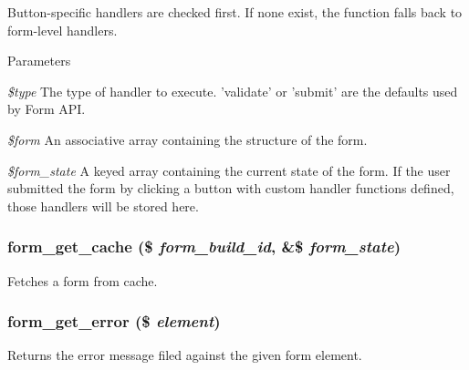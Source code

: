 Button-\/specific handlers are checked first. If none exist, the function falls back to form-\/level handlers.


\begin{DoxyParams}{Parameters}
\item[{\em \$type}]The type of handler to execute. 'validate' or 'submit' are the defaults used by Form API. \item[{\em \$form}]An associative array containing the structure of the form. \item[{\em \$form\_\-state}]A keyed array containing the current state of the form. If the user submitted the form by clicking a button with custom handler functions defined, those handlers will be stored here. \end{DoxyParams}
\hypertarget{group__form__api_gab1da3001a3773a949188b52f61a9cd09}{
\subsubsection[{form\_\-get\_\-cache}]{\setlength{\rightskip}{0pt plus 5cm}form\_\-get\_\-cache (\$ {\em form\_\-build\_\-id}, \/  \&\$ {\em form\_\-state})}}
\label{group__form__api_gab1da3001a3773a949188b52f61a9cd09}
Fetches a form from cache. \hypertarget{group__form__api_gae57581ad2406d61116a133b99142283b}{
\subsubsection[{form\_\-get\_\-error}]{\setlength{\rightskip}{0pt plus 5cm}form\_\-get\_\-error (\$ {\em element})}}
\label{group__form__api_gae57581ad2406d61116a133b99142283b}
Returns the error message filed against the given form element.

